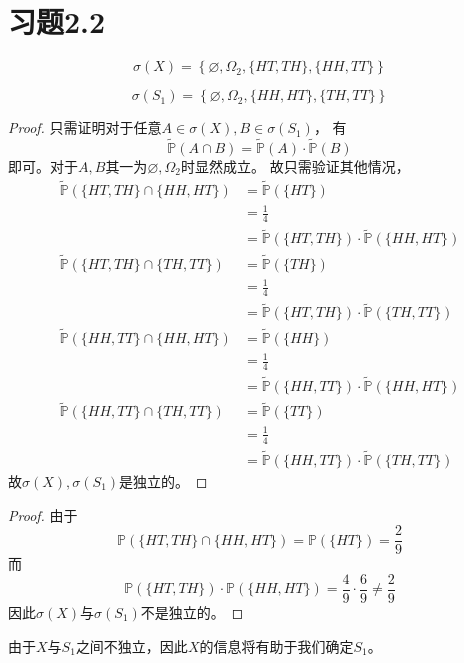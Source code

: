 \documentclass[cn]{homework}
\DeclareMathOperator{\prob}{\mathbb P}
\begin{document}
    \section{习题2.2}
    \begin{subproblem}
        \item
        \[\sigma(X)=\left\{\varnothing,\Omega_2,\{HT,TH\},\{HH,TT\}\right\}\]

        \item
        \[\sigma(S_1)=\left\{\varnothing,\Omega_2,\{HH,HT\},\{TH,TT\}\right\}\]

        \item
        \renewcommand{\prob}{\tilde{\mathbb P}}
        \begin{proof}
            只需证明对于任意$A\in\sigma(X),B\in\sigma(S_1)$，
            有
            \[\prob(A\cap B)=\prob(A)\cdot \prob(B)\]
            即可。对于$A,B$其一为$\varnothing,\Omega_2$时显然成立。
            故只需验证其他情况，
            \[\begin{aligned}
                \prob(\{HT,TH\}\cap\{HH,HT\})&=\prob(\{HT\})\\
                &=\frac{1}{4}\\
                &=\prob(\{HT,TH\})\cdot\prob(\{HH,HT\})\\
                \prob(\{HT,TH\}\cap\{TH,TT\})
                &=\prob(\{TH\})\\
                &=\frac{1}{4}\\
                &=\prob(\{HT,TH\})\cdot\prob(\{TH,TT\})\\
                \prob(\{HH,TT\}\cap\{HH,HT\})
                &=\prob(\{HH\})\\
                &=\frac{1}{4}\\
                &=\prob(\{HH,TT\})\cdot\prob(\{HH,HT\})\\
                \prob(\{HH,TT\}\cap\{TH,TT\})
                &=\prob(\{TT\})\\
                &=\frac{1}{4}\\
                &=\prob(\{HH,TT\})\cdot\prob(\{TH,TT\})
            \end{aligned}\]
            故$\sigma(X),\sigma(S_1)$是独立的。
        \end{proof}        

        \item
        \renewcommand{\prob}{\mathbb P}
        \begin{proof}
            由于
            \[\prob(\{HT,TH\}\cap\{HH,HT\})=\prob(\{HT\})=\frac{2}{9}\]
            而
            \[\prob(\{HT,TH\})\cdot\prob(\{HH,HT\})
            =\frac{4}{9}\cdot\frac{6}{9}
            \neq\frac{2}{9}\]
            因此$\sigma(X)$与$\sigma(S_1)$不是独立的。
        \end{proof}

        \item
        由于$X$与$S_1$之间不独立，因此$X$的信息将有助于我们确定$S_1$。
    \end{subproblem} 
\end{document}
